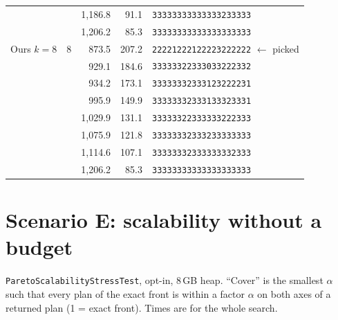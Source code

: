 \documentclass[10pt,a4paper]{article}
\begin{document}
\begin{center}
\begin{tabular}{@{}llrrl@{}}
 &  & {1{,}186.8} & {91.1} & \texttt{33333333333333233333}\\
 &  & {1{,}206.2} & {85.3} & \texttt{33333333333333333333}\\
\midrule
Ours $k{=}8$ & 8 & {873.5} & {207.2} & \texttt{22221222122223222222} $\leftarrow$ picked\\
 &  & {929.1} & {184.6} & \texttt{33333322333033222332}\\
 &  & {934.2} & {173.1} & \texttt{33333332333123222231}\\
 &  & {995.9} & {149.9} & \texttt{33333332333133323331}\\
 &  & {1{,}029.9} & {131.1} & \texttt{33333322333333222333}\\
 &  & {1{,}075.9} & {121.8} & \texttt{33333332333233333333}\\
 &  & {1{,}114.6} & {107.1} & \texttt{33333332333333332333}\\
 &  & {1{,}206.2} & {85.3} & \texttt{33333333333333333333}\\
\bottomrule
\end{tabular}
\end{center}

\section{Scenario E: scalability without a budget}\label{sec:scale}
\texttt{ParetoScalabilityStressTest}, opt-in, 8\,GB heap. ``Cover'' is the smallest $\alpha$ such that every plan of
the exact front is within a factor $\alpha$ on both axes of a returned plan (1 = exact front). Times are for the
whole search.
\end{document}
